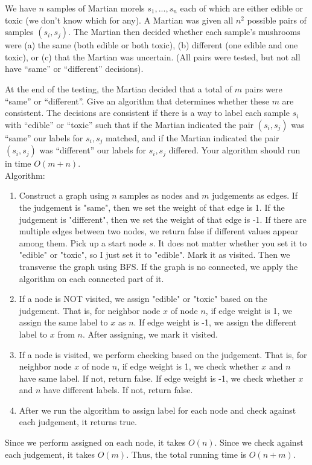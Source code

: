 \documentclass[10pt]{article}
\begin{document}
We have $n$ samples of Martian morels $s_1, ..., s_n$ each of which are either edible or toxic (we don't know which for any). A Martian was given all $n^2$ possible pairs of samples $(s_i, s_j)$. The Martian then decided whether each sample's mushrooms were (a) the same (both edible or both toxic), (b) different (one edible and one toxic), or (c) that the Martian was uncertain. (All pairs were tested, but not all have ``same'' or ``different'' decisions).

At the end of the testing, the Martian decided that a total of $m$ pairs were ``same'' or ``different''. Give an algorithm that determines whether these $m$ are consistent. The decisions are consistent if there is a way to label each sample $s_i$ with ``edible'' or ``toxic'' such that if the Martian indicated the pair $(s_i, s_j)$ was ``same'' our labels for $s_i,s_j$ matched, and if the Martian indicated the pair $(s_i, s_j)$ was ``different'' our labels for $s_i,s_j$ differed. Your algorithm should run in time $O(m+n)$.
\\
Algorithm:
\begin{enumerate}
    \item Construct a graph using $n$ samples as nodes and $m$ judgements as edges. If the judgement is "same", then we set the weight of that edge is 1. If the judgement is "different", then we set the weight of that edge is -1. If there are multiple edges between two nodes, we return false if different values appear among them. Pick up a start node $s$. It does not matter whether you set it to "edible" or "toxic", so I just set it to "edible". Mark it as visited. Then we transverse the graph using BFS. If the graph is no connected, we apply the algorithm on each connected part of it. 
    \item If a node is NOT visited, we assign "edible" or "toxic" based on the judgement. That is, for neighbor node $x$ of node $n$, if edge weight is 1, we assign the same label to $x$ as $n$. If edge weight is -1, we assign the different label to $x$ from $n$. After assigning, we mark it visited.
    \item If a node is visited, we perform checking based on the judgement. That is, for neighbor node $x$ of node $n$, if edge weight is 1, we check whether $x$ and $n$ have same label. If not, return false. If edge weight is -1, we check whether $x$ and $n$ have different labels. If not, return false.
    \item After we run the algorithm to assign label for each node and check against each judgement, it returns true.
\end{enumerate}
Since we perform assigned on each node, it takes $O(n)$. Since we check against each judgement, it takes $O(m)$. Thus, the total running time is $O(n+m)$.\\
%
%
\end{document}
